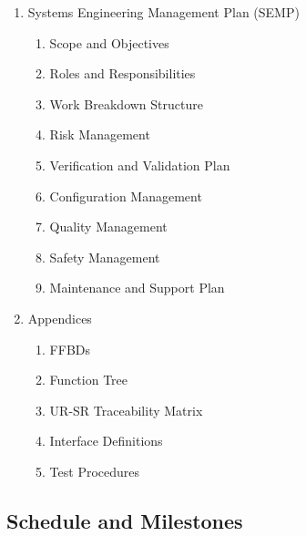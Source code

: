 \documentclass[a4paper,10pt]{article} %
\begin{document}
\begin{enumerate}[label=\arabic*.]
    \item Systems Engineering Management Plan (SEMP)

    \begin{enumerate}[label*=\arabic*]
    
        \item Scope and Objectives

        \item Roles and Responsibilities

        \item Work Breakdown Structure

        \item Risk Management

        \item Verification and Validation Plan

        \item Configuration Management

        \item Quality Management

        \item Safety Management

        \item Maintenance and Support Plan
        
    \end{enumerate}

    \item Appendices

    \begin{enumerate}[label*=\arabic*]
    
        \item FFBDs

        \item Function Tree

        \item UR-SR Traceability Matrix

        \item Interface Definitions

        \item Test Procedures
        
    \end{enumerate}
    
\end{enumerate}

\newpage

\subsection{Schedule and Milestones}
\end{document}

